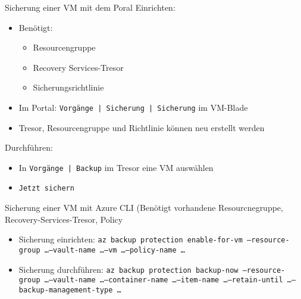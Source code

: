 \begin{flashcard}[Definition]{Sicherung einer VM mit dem Poral}
    Einrichten:
    \begin{itemize}
        \item Benötigt:
            \begin{itemize}
                \item Resourcengruppe
                \item Recovery Services-Tresor
                \item Sicherungsrichtlinie
            \end{itemize}
        \item Im Portal:\newline
            \texttt{Vorgänge | Sicherung | Sicherung} im VM-Blade
        \item Tresor, Resourcengruppe und Richtlinie können neu erstellt werden
    \end{itemize}
    Durchführen:
    \begin{itemize}
        \item In \texttt{Vorgänge | Backup} im Tresor eine VM auswählen
        \item \texttt{Jetzt sichern}
    \end{itemize}

\end{flashcard}

\begin{flashcard}[Definition]{Sicherung einer VM mit Azure CLI}
    (Benötigt vorhandene Resourcnegruppe, Recovery-Services-Tresor, Policy
    \begin{itemize}
        \item Sicherung einrichten:\newline
            \texttt{az backup protection enable-for-vm --resource-group \ldots --vault-name \ldots --vm \ldots --policy-name \ldots}
        \item Sicherung durchführen:\newline
            \texttt{az backup protection backup-now --resource-group \ldots --vault-name \ldots --container-name \ldots --item-name \ldots --retain-until \ldots --backup-management-type \ldots}
    \end{itemize}
\end{flashcard}

